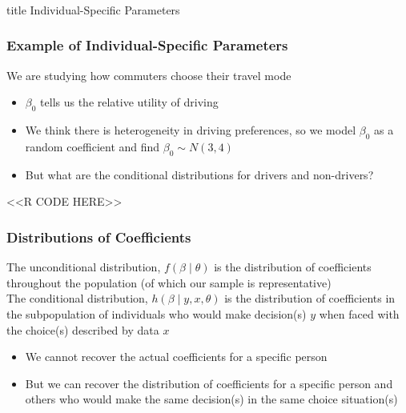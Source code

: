 \documentclass{beamer}
\begin{document}
\begin{frame}\frametitle{}
    \vfill
    \centering
    \begin{beamercolorbox}[center]{title}
        \Large Individual-Specific Parameters
    \end{beamercolorbox}
    \vfill
\end{frame}

\begin{frame}[fragile]\frametitle{Example of Individual-Specific Parameters}
    We are studying how commuters choose their travel mode
    \begin{itemize}
         \item $\beta_0$ tells us the relative utility of driving
         \item We think there is heterogeneity in driving preferences, so we model $\beta_0$ as a random coefficient and find $\beta_0 \sim N(3, 4)$
         \item But what are the conditional distributions for drivers and non-drivers?
     \end{itemize} 
     <<R CODE HERE>>
\end{frame}

\begin{frame}\frametitle{Distributions of Coefficients}
    The unconditional distribution, $f(\beta \mid \theta)$ is the distribution of coefficients throughout the population (of which our sample is representative) \\
    \vspace{3ex}
    The conditional distribution, $h(\beta \mid y, x, \theta)$ is the distribution of coefficients in the subpopulation of individuals who would make decision(s) $y$ when faced with the choice(s) described by data $x$
    \begin{itemize}
    	\item We cannot recover the actual coefficients for a specific person
    	\item But we can recover the distribution of coefficients for a specific person and others who would make the same decision(s) in the same choice situation(s)
    \end{itemize}
\end{frame}
\end{document}

